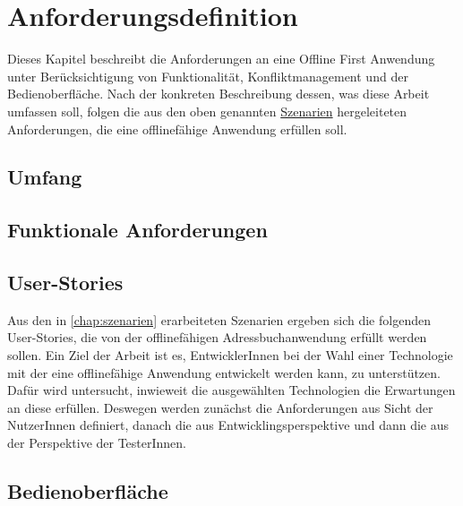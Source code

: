 \chapter{\label{chap:anforderungen}Anforderungsdefinition}
Dieses Kapitel beschreibt die Anforderungen an eine Offline First Anwendung unter Berücksichtigung von Funktionalität, Konfliktmanagement und der Bedienoberfläche.
Nach der konkreten Beschreibung dessen, was diese Arbeit umfassen soll, folgen die aus den oben genannten \hyperref[chap:szenarien]{Szenarien} hergeleiteten Anforderungen, die eine offlinefähige Anwendung erfüllen soll.
%
%
\section{Umfang}

%
%
\section{Funktionale Anforderungen}

%
%
\section{User-Stories}
Aus den in \autoref{chap:szenarien} erarbeiteten Szenarien ergeben sich die folgenden User-Stories, die von der offlinefähigen Adressbuchanwendung erfüllt werden sollen.
Ein Ziel der Arbeit ist es, EntwicklerInnen bei der Wahl einer Technologie mit der eine offlinefähige Anwendung entwickelt werden kann, zu unterstützen. Dafür wird untersucht, inwieweit die ausgewählten Technologien die Erwartungen an diese erfüllen.
Deswegen werden zunächst die Anforderungen aus Sicht der NutzerInnen definiert, danach die aus Entwicklingsperspektive und dann die aus der Perspektive der TesterInnen.



%
%
\section{Bedienoberfläche}
